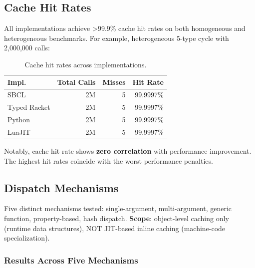\documentclass[sigplan,final,acmsmall,review,screen]{acmart}
\begin{document}
\subsection{Cache Hit Rates}

All implementations achieve >99.9\% cache hit rates on both homogeneous and heterogeneous
benchmarks. For example, heterogeneous 5-type cycle with 2,000,000 calls:

\begin{table}[h!]
\centering
\small
\caption{Cache hit rates across implementations.}
\label{tab:hit-rates}
\begin{tabular}{@{}lrrr@{}}
\toprule
\textbf{Impl.} & \textbf{Total Calls} & \textbf{Misses} & \textbf{Hit Rate} \\
\midrule
SBCL & 2M & 5 & 99.9997\% \\
Typed Racket & 2M & 5 & 99.9997\% \\
Python & 2M & 5 & 99.9997\% \\
LuaJIT & 2M & 5 & 99.9997\% \\
\bottomrule
\end{tabular}
\end{table}

Notably, cache hit rate shows \textbf{zero correlation} with performance improvement. The
highest hit rates coincide with the worst performance penalties.


\subsection{Dispatch Mechanisms}
\label{sec:dispatch-mechanisms}

Five distinct mechanisms tested: single-argument, multi-argument, generic function, property-based, hash dispatch. \textbf{Scope}: object-level caching only (runtime data structures), NOT JIT-based inline caching (machine-code specialization).

\subsubsection{Results Across Five Mechanisms}
\end{document}
